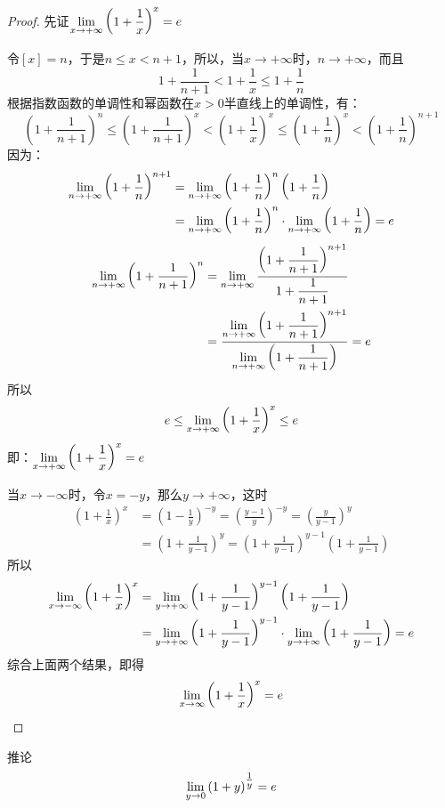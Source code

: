 \begin{proof}
先证$\displaystyle\lim_{x\to +\infty} \left(1+\dfrac{1}{x}\right)^x=e$

令$[x]=n$，于是$n\le x<n+1$，所以，当$x\to +\infty$时，$n\to +\infty$，而且
\[1+\frac{1}{n+1}<1+\frac{1}{x}\le 1+\frac{1}{n}\]
根据指数函数的单调性和幂函数在$x>0$半直线上的单调性，有：
\[\left(1+\frac{1}{n+1}\right)^n\le \left(1+\frac{1}{n+1}\right)^x<\left(1+\frac{1}{x}\right)^x\le \left(1+\frac{1}{n}\right)^x<\left(1+\frac{1}{n}\right)^{n+1}\]
因为：
\[\begin{split}
    \displaystyle\lim_{n\to +\infty} \left(1+\dfrac{1}{n}\right)^{n+1}&=\displaystyle\lim_{n\to +\infty} \left(1+\dfrac{1}{n}\right)^{n}\left(1+\dfrac{1}{n}\right)\\
&=\displaystyle\lim_{n\to +\infty} \left(1+\dfrac{1}{n}\right)^{n}\cdot \displaystyle\lim_{n\to +\infty} \left(1+\dfrac{1}{n}\right)=e
\end{split}\]
\[\begin{split}
    \displaystyle\lim_{n\to +\infty} \left(1+\dfrac{1}{n+1}\right)^{n}&=\displaystyle\lim_{n\to +\infty} \dfrac{\left(1+\dfrac{1}{n+1}\right)^{n+1}}{1+\dfrac{1}{n+1}}\\
    &=\dfrac{\displaystyle\lim_{n\to +\infty}\left(1+\dfrac{1}{n+1}\right)^{n+1} }{\displaystyle\lim_{n\to +\infty}\left(1+\dfrac{1}{n+1}\right) }=e
\end{split}\]
所以
\[e\le\displaystyle\lim_{x\to +\infty}\left(1+\dfrac{1}{x}\right)^{x} \le e\]
即：$\displaystyle\lim_{x\to +\infty}\left(1+\dfrac{1}{x}\right)^{x}=e$

当$x\to -\infty$时，令$x=-y$，那么$y\to +\infty$，这时
\[\begin{split}
    \left(1+\frac{1}{x}\right)^x&=\left(1-\frac{1}{y}\right)^{-y}=\left(\frac{y-1}{y}\right)^{-y}=\left(\frac{y}{y-1}\right)^y\\
    &=\left(1+\frac{1}{y-1}\right)^y=\left(1+\frac{1}{y-1}\right)^{y-1}\left(1+\frac{1}{y-1}\right)
\end{split}\]
所以
\[\begin{split}
    \displaystyle\lim_{x\to -\infty}\left(1+\dfrac{1}{x}\right)^{x}&=\displaystyle\lim_{y\to +\infty}\left(1+\dfrac{1}{y-1}\right)^{y-1}\left(1+\dfrac{1}{y-1}\right)\\
    &=\displaystyle\lim_{y\to +\infty}\left(1+\dfrac{1}{y-1}\right)^{y-1}\cdot \displaystyle\lim_{y\to +\infty}\left(1+\dfrac{1}{y-1}\right)=e
\end{split}\]
综合上面两个结果，即得
$$\displaystyle\lim_{x\to \infty}\left(1+\dfrac{1}{x}\right)^{x}=e$$
\end{proof}

\begin{blk}{推论}
\[\displaystyle\lim_{y\to 0}\left(1+y\right)^{\tfrac{1}{y}}=e\]
\end{blk}

